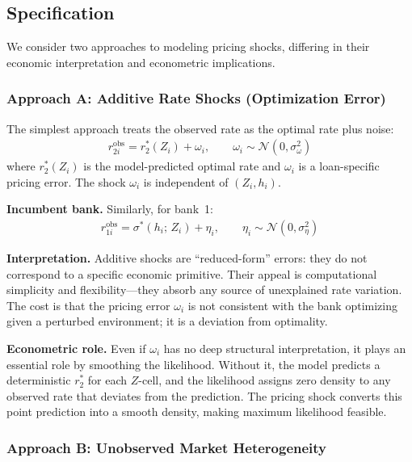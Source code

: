 \documentclass[12pt]{article}
\theoremstyle{plain}
\theoremstyle{plain}
\theoremstyle{definition}  %
\theoremstyle{remark}  %
\begin{document}
\subsection{Specification}

We consider two approaches to modeling pricing shocks, differing in their economic interpretation and econometric implications.

\subsubsection{Approach A: Additive Rate Shocks (Optimization Error)}\label{sec:approach_A}

The simplest approach treats the observed rate as the optimal rate plus noise:
\begin{align}\label{eq:r2_shock_add}
    r_{2i}^{\text{obs}} = r_2^*(Z_i) + \omega_i, \qquad \omega_i \sim \mathcal{N}(0, \sigma_\omega^2)
\end{align}
where $r_2^*(Z_i)$ is the model-predicted optimal rate and $\omega_i$ is a loan-specific pricing error. The shock $\omega_i$ is independent of $(Z_i, h_i)$.

\medskip\noindent
\textbf{Incumbent bank.} Similarly, for bank~1:
\begin{align}\label{eq:r1_shock_add}
    r_{1i}^{\text{obs}} = \sigma^*(h_i;\, Z_i) + \eta_i, \qquad \eta_i \sim \mathcal{N}(0, \sigma_\eta^2)
\end{align}

\textbf{Interpretation.} Additive shocks are ``reduced-form'' errors: they do not correspond to a specific economic primitive. Their appeal is computational simplicity and flexibility---they absorb any source of unexplained rate variation. The cost is that the pricing error $\omega_i$ is not consistent with the bank optimizing given a perturbed environment; it is a deviation from optimality.

\textbf{Econometric role.} Even if $\omega_i$ has no deep structural interpretation, it plays an essential role by smoothing the likelihood. Without it, the model predicts a deterministic $r_2^*$ for each $Z$-cell, and the likelihood assigns zero density to any observed rate that deviates from the prediction. The pricing shock converts this point prediction into a smooth density, making maximum likelihood feasible.

\subsubsection{Approach B: Unobserved Market Heterogeneity}\label{sec:approach_B}
\end{document}
